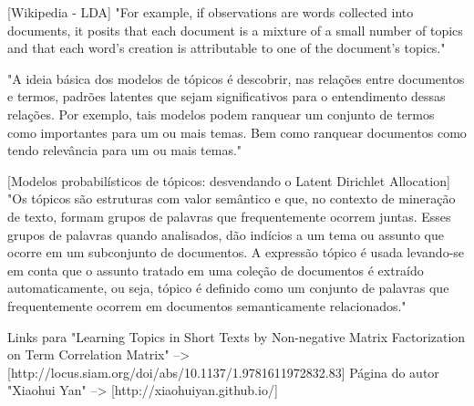 [Wikipedia - LDA]
"For example, if observations are words collected into documents, it posits that each document is a mixture of a small number of topics and that each word's creation is attributable to one of the document's topics."

"A ideia básica dos modelos de tópicos é descobrir, nas relações entre documentos e termos, padrões latentes que sejam significativos para o entendimento dessas relações. Por exemplo, tais modelos podem ranquear um conjunto de termos como importantes para um ou mais temas. Bem como ranquear documentos como tendo relevância para um ou mais temas."


[Modelos probabilísticos de tópicos: desvendando o Latent Dirichlet Allocation]
"Os tópicos são estruturas com valor semântico e que, no contexto de mineração de texto, formam grupos de palavras que frequentemente ocorrem juntas. Esses grupos de palavras quando analisados, dão indícios a um tema ou assunto que ocorre em um subconjunto de documentos. A expressão tópico é usada levando-se em conta que o assunto tratado em uma coleção de documentos é extraído automaticamente, ou seja, tópico é definido como um conjunto de palavras que frequentemente ocorrem em documentos semanticamente relacionados."










Links para "Learning Topics in Short Texts by Non-negative Matrix Factorization on Term Correlation Matrix" --> [http://locus.siam.org/doi/abs/10.1137/1.9781611972832.83]
Página do autor "Xiaohui Yan" --> [http://xiaohuiyan.github.io/]



